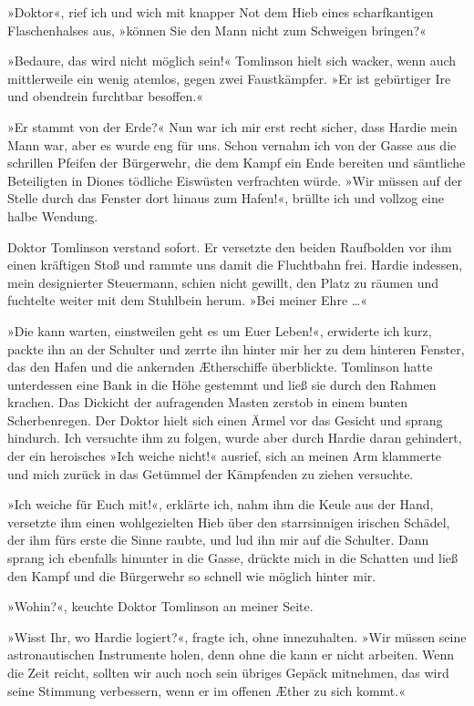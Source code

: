 »Doktor«, rief ich und wich mit knapper Not dem Hieb eines
scharfkantigen Flaschenhalses aus, »können Sie den Mann nicht zum
Schweigen bringen?«

»Bedaure, das wird nicht möglich sein!« Tomlinson hielt sich
wacker, wenn auch mittlerweile ein wenig atemlos, gegen zwei
Faustkämpfer. »Er ist gebürtiger Ire und obendrein furchtbar
besoffen.«

»Er stammt von der Erde?« Nun war ich mir erst recht sicher, dass
Hardie mein Mann war, aber es wurde eng für uns. Schon vernahm ich
von der Gasse aus die schrillen Pfeifen der Bürgerwehr, die dem
Kampf ein Ende bereiten und sämtliche Beteiligten in Diones
tödliche Eiswüsten verfrachten würde. »Wir müssen auf der Stelle
durch das Fenster dort hinaus zum Hafen!«, brüllte ich und vollzog
eine halbe Wendung.

Doktor Tomlinson verstand sofort. Er versetzte den beiden
Raufbolden vor ihm einen kräftigen Stoß und rammte uns damit die
Fluchtbahn frei. Hardie indessen, mein designierter Steuermann,
schien nicht gewillt, den Platz zu räumen und fuchtelte weiter mit
dem Stuhlbein herum. »Bei meiner Ehre \ldots{}«

»Die kann warten, einstweilen geht es um Euer Leben!«, erwiderte
ich kurz, packte ihn an der Schulter und zerrte ihn hinter mir her
zu dem hinteren Fenster, das den Hafen und die ankernden
Ætherschiffe überblickte. Tomlinson hatte unterdessen eine Bank in
die Höhe gestemmt und ließ sie durch den Rahmen krachen. Das
Dickicht der aufragenden Masten zerstob in einem bunten
Scherbenregen. Der Doktor hielt sich einen Ärmel vor das Gesicht
und sprang hindurch. Ich versuchte ihm zu folgen, wurde aber durch
Hardie daran gehindert, der ein heroisches »Ich weiche nicht!«
ausrief, sich an meinen Arm klammerte und mich zurück in das
Getümmel der Kämpfenden zu ziehen versuchte.

»Ich weiche für Euch mit!«, erklärte ich, nahm ihm die Keule aus
der Hand, versetzte ihm einen wohlgezielten Hieb über den
starrsinnigen irischen Schädel, der ihm fürs erste die Sinne
raubte, und lud ihn mir auf die Schulter. Dann sprang ich ebenfalls
hinunter in die Gasse, drückte mich in die Schatten und ließ den
Kampf und die Bürgerwehr so schnell wie möglich hinter mir.

\bigpar

»Wohin?«, keuchte Doktor Tomlinson an meiner Seite.

»Wisst Ihr, wo Hardie logiert?«, fragte ich, ohne innezuhalten.
»Wir müssen seine astronautischen Instrumente holen, denn ohne die
kann er nicht arbeiten. Wenn die Zeit reicht, sollten wir auch noch
sein übriges Gepäck mitnehmen, das wird seine Stimmung verbessern,
wenn er im offenen Æther zu sich kommt.«


